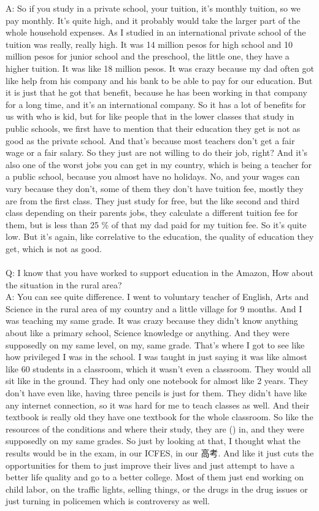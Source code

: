 \documentclass{phyasgn}\usepackage{nag}
\begin{document}
A: So if you study in a private school, your tuition, it's monthly tuition, so we pay monthly. It's quite high, and it probably would take the larger part of the whole household expenses. As I studied in an international private school of the tuition was really, really high. It was 14 million pesos for high school and 10 million pesos for junior school and the preschool, the little one, they have a higher tuition. It was like 18 million pesos. It was crazy because my dad often got like help from his company and his bank to be able to pay for our education. But it is just that he got that benefit, because he has been working in that company for a long time, and it's an international company. So it has a lot of benefits for us with who is kid, but for like people that in the lower classes that study in public schools, we first have to mention that their education they get is not as good as the private school. And that's because most teachers don't get a fair wage or a fair salary. So they just are not willing to do their job, right? And it's also one of the worst jobs you can get in my country, which is being a teacher for a public school, because you almost have no holidays. No, and your wages can vary because they don't, some of them they don't have tuition fee, mostly they are from the first class. They just study for free, but the like second and third class depending on their parents jobs, they calculate a different tuition fee for them, but is less than 25 \% of that my dad paid for my tuition fee. So it's quite low. But it's again, like correlative to the education, the quality of education they get, which is not as good.\\
\\
Q: I know that you have worked to support education in the Amazon, How about the situation in the rural area?\\
A: You can see quite difference. I went to voluntary teacher of English, Arts and Science in the rural area of my country and a little village for 9 months. And I was teaching my same grade. It was crazy because they didn't know anything about like a primary school, Science knowledge or anything. And they were supposedly on my same level, on my, same grade. That's where I got to see like how privileged I was in the school. I was taught in just saying it was like almost like 60 students in a classroom, which it wasn't even a classroom. They would all sit like in the ground. They had only one notebook for almost like 2 years. They don't have even like, having three pencils is just for them. They didn't have like any internet connection, so it was hard for me to teach classes as well. And their textbook is really old they have one textbook for the whole classroom. So like the resources of the conditions and where their study, they are () in, and they were supposedly on my same grades. So just by looking at that, I thought what the results would be in the exam, in our ICFES, in our 高考. And like it just cuts the opportunities for them to just improve their lives and just attempt to have a better life quality and go to a better college. Most of them just end working on child labor, on the traffic lights, selling things, or the drugs in the drug issues or just turning in policemen which is controversy as well.\\
\end{document}
